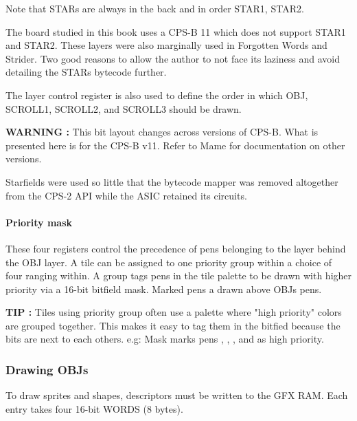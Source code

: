 Note that STARs are always in the back and in order STAR1, STAR2.
  
 

The board studied in this book uses a CPS-B 11 which does not support STAR1 and STAR2. These layers were also marginally used in Forgotten Words and Strider. Two good reasons to allow the author to not face its laziness and avoid detailing the STARs bytecode further.



The layer control register is also used to define the order in which OBJ, SCROLL1, SCROLL2, and SCROLL3 should be drawn.

 

\textbf{WARNING :} This bit layout changes across versions of CPS-B. What is presented here is for the CPS-B v11. Refer to Mame for documentation on other versions.

\begin{trivia}
Starfields were used so little that the bytecode mapper was removed altogether from the CPS-2 API while the ASIC retained its circuits.
\end{trivia}



\paragraph{Priority mask}
These four registers control the precedence of pens belonging to the layer behind the OBJ layer. A tile can be assigned to one priority group within a choice of four ranging within\icode{[0-3]}. A group tags pens in the tile palette to be drawn with higher priority via a 16-bit bitfield mask. Marked pens a drawn above OBJs pens.



 

\textbf{TIP :} Tiles using priority group often use a palette where "high priority" colors are grouped together. This makes it easy to tag them in the bitfied because the bits are next to each others. e.g: Mask  marks pens , , , and  as high priority.




\subsubsection{Drawing OBJs}
To draw sprites and shapes, descriptors must be written to the GFX RAM. Each entry takes four 16-bit WORDS (8 bytes).

